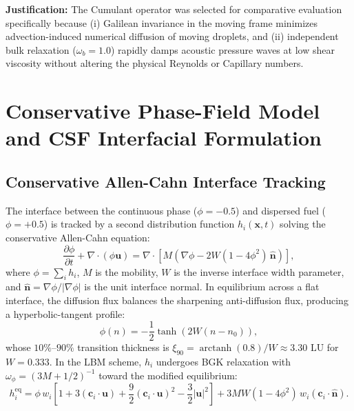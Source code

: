 \documentclass[11pt,a4paper]{article}
\begin{document}
\textbf{Justification:} The Cumulant operator was selected for comparative evaluation specifically because (i) Galilean invariance in the moving frame minimizes advection-induced numerical diffusion of moving droplets, and (ii) independent bulk relaxation ($\omega_b = 1.0$) rapidly damps acoustic pressure waves at low shear viscosity without altering the physical Reynolds or Capillary numbers.

\section{Conservative Phase-Field Model and CSF Interfacial Formulation}
\label{app:pf}

\subsection{Conservative Allen-Cahn Interface Tracking}

The interface between the continuous phase ($\phi = -0.5$) and dispersed fuel ($\phi = +0.5$) is tracked by a second distribution function $h_i(\mathbf{x}, t)$ solving the conservative Allen-Cahn equation:
\begin{equation}
    \frac{\partial \phi}{\partial t} + \nabla \cdot (\phi \mathbf{u}) = \nabla \cdot \left[ M \left( \nabla \phi - 2W (1 - 4\phi^2)\,\hat{\mathbf{n}} \right) \right],
\end{equation}
where $\phi = \sum_i h_i$, $M$ is the mobility, $W$ is the inverse interface width parameter, and $\hat{\mathbf{n}} = \nabla \phi / |\nabla \phi|$ is the unit interface normal. In equilibrium across a flat interface, the diffusion flux balances the sharpening anti-diffusion flux, producing a hyperbolic-tangent profile:
\begin{equation}
    \phi(n) = -\frac{1}{2}\tanh\left(2 W (n - n_0)\right),
\end{equation}
whose $10\%\text{--}90\%$ transition thickness is $\xi_{90} = \operatorname{arctanh}(0.8)/W \approx 3.30\text{ LU}$ for $W = 0.333$. In the LBM scheme, $h_i$ undergoes BGK relaxation with $\omega_\phi = (3M + 1/2)^{-1}$ toward the modified equilibrium:
\begin{equation}
    h_i^{\mathrm{eq}} = \phi\,w_i \left[ 1 + 3(\mathbf{c}_i \cdot \mathbf{u}) + \frac{9}{2}(\mathbf{c}_i \cdot \mathbf{u})^2 - \frac{3}{2}|\mathbf{u}|^2 \right] + 3 M W (1 - 4\phi^2)\,w_i (\mathbf{c}_i \cdot \hat{\mathbf{n}}).
\end{equation}
\end{document}

